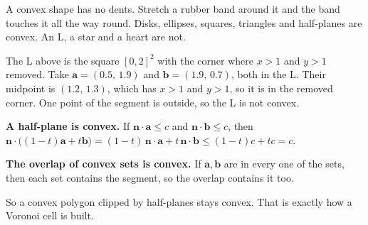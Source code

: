 \documentclass[11pt,a4paper]{article}
\newcommand{\vect}[1]{\mathbf{#1}}
\begin{document}
\begin{plainbox}
A convex shape has no dents. Stretch a rubber band around it and the band touches it all the way round. Disks,
ellipses, squares, triangles and half-planes are convex. An L, a star and a heart are not.
\end{plainbox}

\begin{center}
\end{center}

\begin{examplebox}
The L above is the square $[0,2]^2$ with the corner where $x>1$ and $y>1$ removed. Take $\vect{a}=(0.5,\,1.9)$ and
$\vect{b}=(1.9,\,0.7)$, both in the L. Their midpoint is $(1.2,\,1.3)$, which has $x>1$ and $y>1$, so it is in the
removed corner. One point of the segment is outside, so the L is not convex.
\end{examplebox}

\begin{whybox}
\textbf{A half-plane is convex.} If $\vect{n}\cdot\vect{a}\le c$ and $\vect{n}\cdot\vect{b}\le c$, then
$\vect{n}\cdot\big((1-t)\vect{a}+t\vect{b}\big)=(1-t)\,\vect{n}\cdot\vect{a}+t\,\vect{n}\cdot\vect{b}\le(1-t)c+tc=c$.

\textbf{The overlap of convex sets is convex.} If $\vect{a},\vect{b}$ are in every one of the sets, then each set
contains the segment, so the overlap contains it too.

So a convex polygon clipped by half-planes stays convex. That is exactly how a Voronoi cell is built.
\end{whybox}
\end{document}
